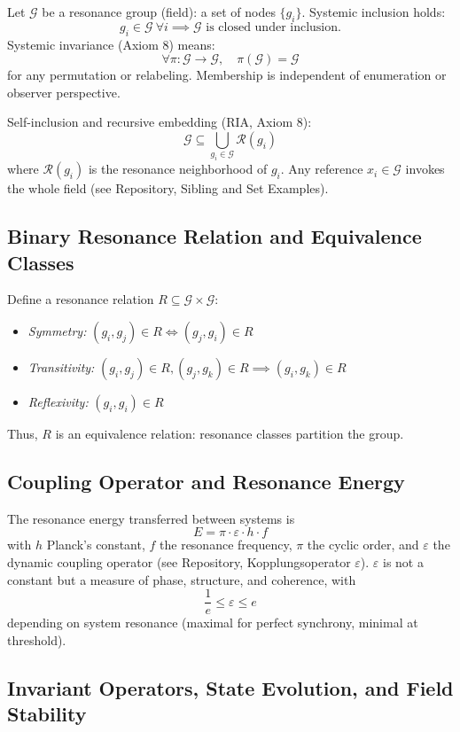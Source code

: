 \documentclass[12pt]{article}
\begin{document}
Let $\mathcal{G}$ be a resonance group (field): a set of nodes $\{g_i\}$. Systemic inclusion holds:
\[
g_i \in \mathcal{G}\ \forall i \implies \mathcal{G} \text{ is closed under inclusion.}
\]
Systemic invariance (Axiom 8) means:
\[
\forall \pi : \mathcal{G} \to \mathcal{G},\quad \pi(\mathcal{G}) = \mathcal{G}
\]
for any permutation or relabeling. Membership is independent of enumeration or observer perspective.

Self-inclusion and recursive embedding (RIA, Axiom 8):
\[
\mathcal{G} \subseteq \bigcup_{g_i \in \mathcal{G}} \mathcal{R}(g_i)
\]
where $\mathcal{R}(g_i)$ is the resonance neighborhood of $g_i$. Any reference $x_i \in \mathcal{G}$ invokes the whole field (see Repository, Sibling and Set Examples).

\subsection{Binary Resonance Relation and Equivalence Classes}

Define a resonance relation $R \subseteq \mathcal{G} \times \mathcal{G}$:
\begin{itemize}
	\item \textit{Symmetry:} $(g_i, g_j) \in R \iff (g_j, g_i) \in R$
	\item \textit{Transitivity:} $(g_i, g_j) \in R, (g_j, g_k) \in R \implies (g_i, g_k) \in R$
	\item \textit{Reflexivity:} $(g_i, g_i) \in R$
\end{itemize}
Thus, $R$ is an equivalence relation: resonance classes partition the group.

\subsection{Coupling Operator and Resonance Energy}

The resonance energy transferred between systems is
\[
E = \pi \cdot \varepsilon \cdot h \cdot f
\]
with $h$ Planck's constant, $f$ the resonance frequency, $\pi$ the cyclic order, and $\varepsilon$ the dynamic coupling operator (see Repository, Kopplungsoperator $\varepsilon$). $\varepsilon$ is not a constant but a measure of phase, structure, and coherence, with
\[
\frac{1}{e} \leq \varepsilon \leq e
\]
depending on system resonance (maximal for perfect synchrony, minimal at threshold).

\subsection{Invariant Operators, State Evolution, and Field Stability}
\end{document}
